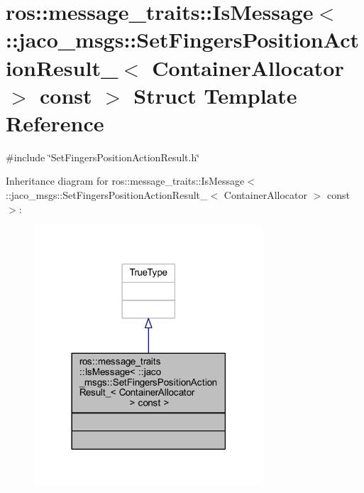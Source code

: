 \hypertarget{structros_1_1message__traits_1_1IsMessage_3_01_1_1jaco__msgs_1_1SetFingersPositionActionResult__e9cfa5ea6f52c2558a064565c2b5cfc0}{}\section{ros\+:\+:message\+\_\+traits\+:\+:Is\+Message$<$ \+:\+:jaco\+\_\+msgs\+:\+:Set\+Fingers\+Position\+Action\+Result\+\_\+$<$ Container\+Allocator $>$ const $>$ Struct Template Reference}
\label{structros_1_1message__traits_1_1IsMessage_3_01_1_1jaco__msgs_1_1SetFingersPositionActionResult__e9cfa5ea6f52c2558a064565c2b5cfc0}


{\ttfamily \#include \char`\"{}Set\+Fingers\+Position\+Action\+Result.\+h\char`\"{}}



Inheritance diagram for ros\+:\+:message\+\_\+traits\+:\+:Is\+Message$<$ \+:\+:jaco\+\_\+msgs\+:\+:Set\+Fingers\+Position\+Action\+Result\+\_\+$<$ Container\+Allocator $>$ const $>$\+:
\nopagebreak
\begin{figure}[H]
\begin{center}
\leavevmode
\includegraphics[width=242pt]{d1/d81/structros_1_1message__traits_1_1IsMessage_3_01_1_1jaco__msgs_1_1SetFingersPositionActionResult__86d97375a4cd6af37603a19263e52fba}
\end{center}
\end{figure}


